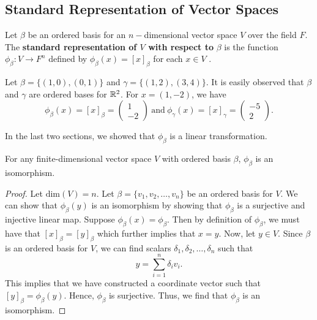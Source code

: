 \subsection{Standard Representation of Vector Spaces}

\begin{definition}
    Let \( \beta \) be an ordered basis for an \( n- \)dimensional vector space \( V  \) over the field \( F \). The \textbf{standard representation of \( V \) with respect to} \( \beta  \) is the function \( {\phi}_{\beta}: V \to F^{n} \) defined by \( {\phi}_{\beta}(x) = [x]_{\beta} \) for each \( x \in V  \) .    
\end{definition}

\begin{eg}
    Let \( \beta = \{ (1,0), (0,1) \}  \) and \( \gamma = \{ (1,2), (3,4) \}  \). It is easily observed that \( \beta  \) and \( \gamma  \) are ordered bases for \( \mathbb{R}^{2} \). For \( x = (1,-2) \), we have
    \[  {\phi}_{\beta}(x) = [x]_{\beta} = \begin{pmatrix}
        1 \\
        -2
        \end{pmatrix} \ \text{and} \ {\phi}_{\gamma}(x) = [x]_{\gamma} = \begin{pmatrix}
        -5 \\
        2 
    \end{pmatrix}.  \]
\end{eg}

In the last two sections, we showed that \( {\phi}_{\beta} \) is a linear transformation. 

\begin{theorem}
    For any finite-dimensional vector space \( V  \) with ordered basis \( \beta  \), \( {\phi}_{\beta}  \) is an isomorphism.
\end{theorem}
\begin{proof}
    Let \( \text{dim}(V) = n  \). Let \( \beta = \{ {v}_{1}, { v }_{2}, \dots, {v}_{n} \}   \) be an ordered basis for \( V  \). We can show that \( {\phi}_{\beta}(y)  \) is an isomorphism by showing that \( {\phi}_{\beta} \) is a surjective and injective linear map. Suppose \( {\phi}_{\beta}(x) = {\phi}_{\beta} \). Then by definition of \( {\phi}_{\beta} \), we must have that \( [x]_{\beta} = [y]_{\beta} \) which further implies that \( x = y  \). Now, let \( y \in V  \). Since \( \beta \) is an ordered basis for \( V  \), we can find scalars \( {\delta}_{1}, {\delta}_{2}, \dots, {\delta}_{n} \) such that 
    \[  y = \sum_{ i=1  }^{ n } {\delta}_{i} {v}_{i}. \]
    This implies that we have constructed a coordinate vector such that \( [y]_{\beta} = {\phi}_{\beta}(y)\). Hence, \( {\phi}_{\beta} \) is surjective. Thus, we find that \( {\phi}_{\beta} \) is an isomorphism.
\end{proof}
